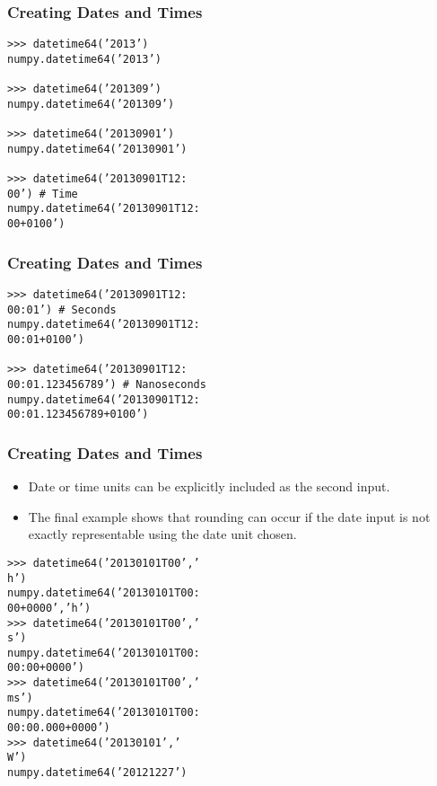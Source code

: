 \documentclass[KSmainSlides.tex]{subfiles}
\begin{document}
	\begin{frame}[fragile]
		\frametitle{Creating Dates and Times}
\begin{framed}
\begin{verbatim}
>>> datetime64(’2013’)
numpy.datetime64(’2013’)

>>> datetime64(’201309’)
numpy.datetime64(’201309’)

>>> datetime64(’20130901’)
numpy.datetime64(’20130901’)

>>> datetime64(’20130901T12:
00’) # Time
numpy.datetime64(’20130901T12:
00+0100’)
\end{verbatim}
\end{framed}
\end{frame}
\begin{frame}[fragile]
	\frametitle{Creating Dates and Times}
	\begin{framed}
		\begin{verbatim}
>>> datetime64(’20130901T12:
00:01’) # Seconds
numpy.datetime64(’20130901T12:
00:01+0100’)

>>> datetime64(’20130901T12:
00:01.123456789’) # Nanoseconds
numpy.datetime64(’20130901T12:
00:01.123456789+0100’)
\end{verbatim}
\end{framed}
\end{frame}
\begin{frame}[fragile]
\frametitle{Creating Dates and Times}
\begin{itemize}
\item Date or time units can be explicitly included as the second input. 
\item The final example shows that rounding
can occur if the date input is not exactly representable using the date unit chosen.
\end{itemize}


\end{frame}
\begin{frame}[fragile]
	\begin{framed}
		\begin{verbatim}
>>> datetime64(’20130101T00’,’
h’)
numpy.datetime64(’20130101T00:
00+0000’,’h’)
>>> datetime64(’20130101T00’,’
s’)
numpy.datetime64(’20130101T00:
00:00+0000’)
>>> datetime64(’20130101T00’,’
ms’)
numpy.datetime64(’20130101T00:
00:00.000+0000’)
>>> datetime64(’20130101’,’
W’)
numpy.datetime64(’20121227’)
\end{verbatim}
\end{framed}


\end{frame}
\end{document}
